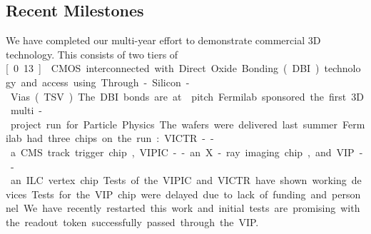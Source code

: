 \subsection{Recent Milestones}
We have completed our multi-year effort to demonstrate commercial 3D technology. This consists of two tiers of \unit[0.13]{\micron} CMOS interconnected with Direct Oxide Bonding (DBI) technology and access using Through-Silicon-Vias (TSV). The DBI bonds are at \unit[4]{\micron} pitch. Fermilab sponsored the first 3D multi-project run for Particle Physics. The wafers were delivered last summer. Fermilab had three chips on the run: VICTR -- a CMS track trigger chip, VIPIC -- an X-ray imaging chip, and VIP -- an ILC vertex chip. Tests of the VIPIC and VICTR have shown working devices.  Tests for the VIP chip were delayed due to lack of funding and personnel.  We have recently restarted this work and initial tests are promising with the readout token successfully passed through the VIP.

